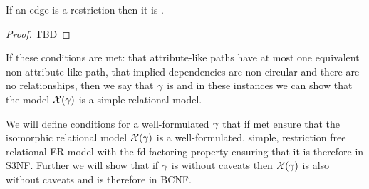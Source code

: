 \begin{lemma}
If an edge is a restriction then it is .
\end{lemma}
\begin{proof}
TBD
\end{proof}

If these conditions are met: that attribute-like paths have at most one equivalent non attribute-like path, that implied dependencies are non-circular and there are no   relationships, then we say that $\gamma$ is  and in these instances we can show that 
the model $\mathcal{X}(\gamma)$ is a simple relational model. 

We will define conditions for a well-formulated $\gamma$  that if met ensure 
 that the isomorphic relational model $\mathcal{X}(\gamma)$ is a well-formulated, simple, restriction free relational ER model with the fd factoring property 
ensuring that it is therefore in S3NF.  Further we will show that if $\gamma$ is without caveats then $\mathcal{X}(\gamma)$ is also without caveats and is therefore in BCNF. 

